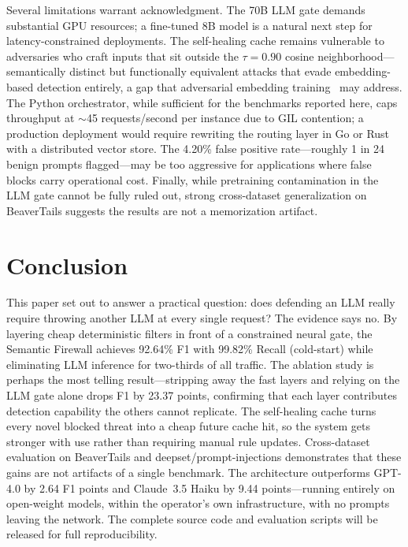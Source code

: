 \documentclass[conference]{IEEEtran}
\begin{document}
Several limitations warrant acknowledgment. The 70B LLM gate demands
substantial GPU resources; a fine-tuned 8B model is a natural next step
for latency-constrained deployments. The self-healing cache remains
vulnerable to adversaries who craft inputs that sit outside the
$\tau{=}0.90$ cosine neighborhood---semantically distinct but functionally
equivalent attacks that evade embedding-based detection entirely, a gap
that adversarial embedding training~\cite{zou2023universal} may address.
The Python orchestrator, while sufficient for the benchmarks reported here,
caps throughput at $\sim$45 requests/second per instance due to GIL
contention; a production deployment would require rewriting the routing
layer in Go or Rust with a distributed vector store. The 4.20\% false
positive rate---roughly 1 in 24 benign prompts flagged---may be too
aggressive for applications where false blocks carry operational cost.
Finally, while pretraining contamination in
the LLM gate cannot be fully ruled out, strong cross-dataset generalization
on BeaverTails suggests the results are not a memorization artifact.



\section{Conclusion}

This paper set out to answer a practical question: does defending an
LLM really require throwing another LLM at every single request? The
evidence says no. By layering cheap deterministic filters in front of
a constrained neural gate, the Semantic Firewall achieves 92.64\% F1
with 99.82\% Recall (cold-start) while eliminating LLM inference for two-thirds
of all traffic. The ablation study is perhaps the most telling
result---stripping away the fast layers and relying on the LLM gate
alone drops F1 by 23.37 points, confirming that each layer
contributes detection capability the others cannot replicate. The
self-healing cache turns every novel blocked threat into a cheap
future cache hit, so the system gets stronger with use rather than
requiring manual rule updates. Cross-dataset evaluation on
BeaverTails and deepset/prompt-injections demonstrates that these gains are not artifacts of a single
benchmark. The architecture outperforms GPT-4.0 by 2.64 F1 points
and Claude~3.5 Haiku by 9.44 points---running entirely on open-weight
models, within the operator's own infrastructure, with no prompts
leaving the network. The complete source code and evaluation scripts
will be released for full reproducibility.
\end{document}
